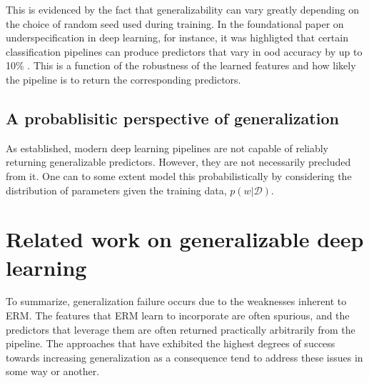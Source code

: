 		This is evidenced by the fact that generalizability can vary greatly depending on the choice of random seed used during training. In the foundational paper on underspecification in deep learning, for instance, it was highligted that certain classification pipelines can produce predictors that vary in ood accuracy by up to 10\% \cite{damour2020underspecification}. This is a function of the robustness of the learned features and how likely the pipeline is to return the corresponding predictors. 
	\subsection{A probablisitic perspective of generalization}
		As established, modern deep learning pipelines are not capable of reliably returning generalizable predictors. However, they are not necessarily precluded from it. One can to some extent model this probabilistically by considering the distribution of parameters given the training data, \(p(w | \mathcal{D})\). 
		
\section{Related work on generalizable deep learning}
	To summarize, generalization failure occurs due to the weaknesses inherent to ERM. The features that ERM learn to incorporate are often spurious, and the predictors that leverage them are often returned practically arbitrarily from the pipeline. The approaches that have exhibited the highest degrees of success towards increasing generalization as a consequence tend to address these issues in some way or another. 
	

